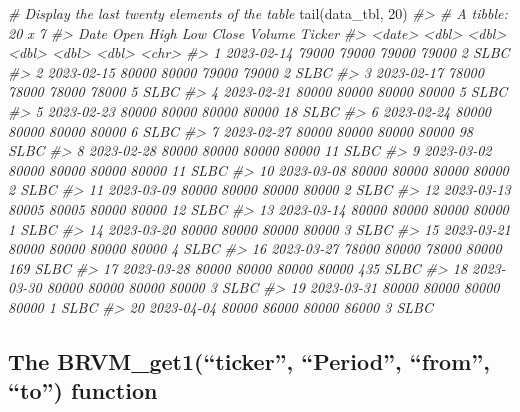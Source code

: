 \documentclass[
]{article}
\newenvironment{Shaded}{\begin{snugshade}}{\end{snugshade}}
\newcommand{\CommentTok}[1]{\textcolor[rgb]{0.56,0.35,0.01}{\textit{#1}}}
\newcommand{\DecValTok}[1]{\textcolor[rgb]{0.00,0.00,0.81}{#1}}
\newcommand{\FunctionTok}[1]{\textcolor[rgb]{0.00,0.00,0.00}{#1}}
\newcommand{\NormalTok}[1]{#1}
\begin{document}
\begin{Shaded}
\begin{Highlighting}[]
\CommentTok{\# Display the last twenty elements of the table}
\FunctionTok{tail}\NormalTok{(data\_tbl, }\DecValTok{20}\NormalTok{)}
\CommentTok{\#\textgreater{} \# A tibble: 20 x 7}
\CommentTok{\#\textgreater{}    Date        Open  High   Low Close Volume Ticker}
\CommentTok{\#\textgreater{}    \textless{}date\textgreater{}     \textless{}dbl\textgreater{} \textless{}dbl\textgreater{} \textless{}dbl\textgreater{} \textless{}dbl\textgreater{}  \textless{}dbl\textgreater{} \textless{}chr\textgreater{} }
\CommentTok{\#\textgreater{}  1 2023{-}02{-}14 79000 79000 79000 79000      2 SLBC  }
\CommentTok{\#\textgreater{}  2 2023{-}02{-}15 80000 80000 79000 79000      2 SLBC  }
\CommentTok{\#\textgreater{}  3 2023{-}02{-}17 78000 78000 78000 78000      5 SLBC  }
\CommentTok{\#\textgreater{}  4 2023{-}02{-}21 80000 80000 80000 80000      5 SLBC  }
\CommentTok{\#\textgreater{}  5 2023{-}02{-}23 80000 80000 80000 80000     18 SLBC  }
\CommentTok{\#\textgreater{}  6 2023{-}02{-}24 80000 80000 80000 80000      6 SLBC  }
\CommentTok{\#\textgreater{}  7 2023{-}02{-}27 80000 80000 80000 80000     98 SLBC  }
\CommentTok{\#\textgreater{}  8 2023{-}02{-}28 80000 80000 80000 80000     11 SLBC  }
\CommentTok{\#\textgreater{}  9 2023{-}03{-}02 80000 80000 80000 80000     11 SLBC  }
\CommentTok{\#\textgreater{} 10 2023{-}03{-}08 80000 80000 80000 80000      2 SLBC  }
\CommentTok{\#\textgreater{} 11 2023{-}03{-}09 80000 80000 80000 80000      2 SLBC  }
\CommentTok{\#\textgreater{} 12 2023{-}03{-}13 80005 80005 80000 80000     12 SLBC  }
\CommentTok{\#\textgreater{} 13 2023{-}03{-}14 80000 80000 80000 80000      1 SLBC  }
\CommentTok{\#\textgreater{} 14 2023{-}03{-}20 80000 80000 80000 80000      3 SLBC  }
\CommentTok{\#\textgreater{} 15 2023{-}03{-}21 80000 80000 80000 80000      4 SLBC  }
\CommentTok{\#\textgreater{} 16 2023{-}03{-}27 78000 80000 78000 80000    169 SLBC  }
\CommentTok{\#\textgreater{} 17 2023{-}03{-}28 80000 80000 80000 80000    435 SLBC  }
\CommentTok{\#\textgreater{} 18 2023{-}03{-}30 80000 80000 80000 80000      3 SLBC  }
\CommentTok{\#\textgreater{} 19 2023{-}03{-}31 80000 80000 80000 80000      1 SLBC  }
\CommentTok{\#\textgreater{} 20 2023{-}04{-}04 80000 86000 80000 86000      3 SLBC}
\end{Highlighting}
\end{Shaded}

\hypertarget{the-brvm_get1ticker-period-from-to-function}{%
\subsection{\texorpdfstring{The \textbf{BRVM\_get1(``ticker'',
``Period'', ``from'', ``to'')}
function}{The BRVM\_get1(``ticker'', ``Period'', ``from'', ``to'') function}}\label{the-brvm_get1ticker-period-from-to-function}}
\end{document}
